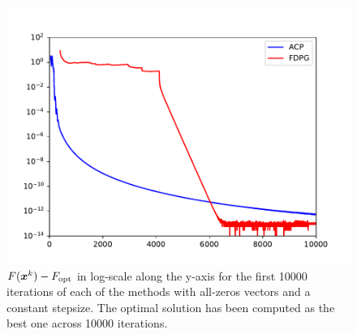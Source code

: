 \begin{figure}[H]
  \centering
  \includegraphics[width=14cm]{images/part3_ex2_fig3.pdf}
  \caption{$F(\boldsymbol x^k)-F_{\text{opt}}$ in log-scale along the 
  y-axis for the first 10000 iterations of each of the methods 
  with all-zeros vectors and a constant stepsize. The optimal solution has been computed as the best one across 10000 iterations. }
  \label{fig:ex6}
\end{figure}